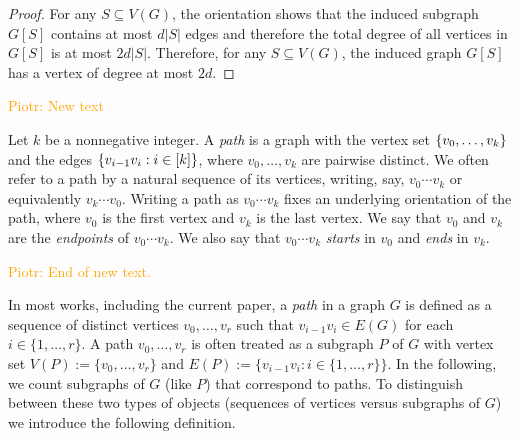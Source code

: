 \documentclass{patmorin}
\newcommand{\defin}[1]{\emph{\color{brightmaroon}#1}}
\DeclarePairedDelimiter\set{\{}{\}}
\newcommand{\jedrzej}[1]{\textcolor{ProcessBlue}{Jędrzej: #1}}
\newcommand{\piotr}[1]{\textcolor{orange}{Piotr: #1}}
\begin{document}
\begin{proof}
  For any $S\subseteq V(G)$, the orientation shows that the induced subgraph $G[S]$ contains at most $d|S|$ edges and therefore the total degree of all vertices in $G[S]$ is at most $2d|S|$.  Therefore, for any $S\subseteq V(G)$, the induced graph $G[S]$ has a vertex of degree at most $2d$.
\end{proof}

\piotr{New text}

Let $k$ be a nonnegative integer.
A \emph{path} is a graph 
with the vertex set $\set{v_0,\ldots,v_k}$ and the 
edges $\set{v_{i-1}v_{i} : i \in [k]}$, where $v_0,\dots,v_k$ are pairwise distinct. 
We often refer to a path by a natural sequence of its vertices, 
writing, say, $v_0\cdots v_k$ or equivalently $v_k \cdots v_0$.
Writing a path as $v_0\cdots v_k$ fixes an underlying orientation of the path, where $v_0$ is the first vertex and $v_k$ is the last vertex.
We say that $v_0$ and $v_k$ are the \emph{endpoints} of $v_0 \cdots v_k$.
We also say that $v_0 \cdots v_k$ \emph{starts} in $v_0$ and \emph{ends} in $v_k$.


\piotr{End of new text.}

In most works, including the current paper, a \defin{path} in a graph $G$ is defined as a sequence of distinct vertices $v_0,\ldots,v_r$ such that $v_{i-1}v_i\in E(G)$ for each $i\in\{1,\ldots,r\}$. A path $v_0,\ldots,v_r$ is often treated as a subgraph $P$ of $G$ with vertex set $V(P):=\{v_0,\ldots,v_r\}$ and $E(P):=\{v_{i-1}v_i:i\in\{1,\ldots,r\}\}$.  In the following, we count subgraphs of $G$ (like $P$) that correspond to paths. To distinguish between these two types of objects (sequences of vertices versus subgraphs of $G$) we introduce the following definition.
\end{document}
